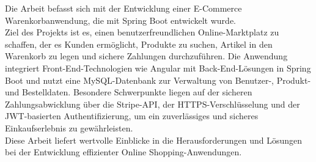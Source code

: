 \kurzfassung

Die Arbeit befasst sich mit der Entwicklung einer E-Commerce Warenkorbanwendung, die mit Spring Boot entwickelt wurde. \\
Ziel des Projekts ist es, einen benutzerfreundlichen Online-Marktplatz zu schaffen, der es Kunden ermöglicht, Produkte zu suchen, Artikel in den Warenkorb zu legen und sichere Zahlungen durchzuführen. Die Anwendung integriert Front-End-Technologien wie Angular mit Back-End-Lösungen in Spring Boot und nutzt eine MySQL-Datenbank zur Verwaltung von Benutzer-, Produkt- und Bestelldaten. Besondere Schwerpunkte liegen auf der sicheren Zahlungsabwicklung über die Stripe-API, der HTTPS-Verschlüsselung und der JWT-basierten Authentifizierung, um ein zuverlässiges und sicheres Einkaufserlebnis zu gewährleisten. \\
Diese Arbeit liefert wertvolle Einblicke in die Herausforderungen und Lösungen bei der Entwicklung effizienter Online Shopping-Anwendungen.

